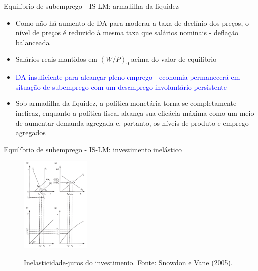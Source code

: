 \documentclass[10pt]{beamer}
\begin{document}
\begin{frame}{Equilíbrio de subemprego - IS-LM: armadilha da liquidez}
    \begin{itemize}
        \item Como não há aumento de DA para moderar a taxa de declínio dos preços, o nível de preços é reduzido à mesma taxa que salários nominais - deflação balanceada
        \bigskip
        \item Salários reais mantidos em $(W/P)_0$ acima do valor de equilíbrio
        \bigskip
        \item \textcolor{blue}{DA insuficiente para alcançar pleno emprego - economia permanecerá em situação de subemprego com um desemprego involuntário persistente}
        \bigskip
        \item Sob armadilha da liquidez, a política monetária torna-se completamente ineficaz, enquanto a política fiscal alcança sua eficácia máxima como um meio de aumentar demanda agregada e, portanto, os níveis de produto e emprego agregados
    \end{itemize}
\end{frame}

\begin{frame}{Equilíbrio de subemprego - IS-LM: investimento inelástico}
    \begin{figure}
        \centering
        \href{https://raw.githubusercontent.com/pvfonseca/pec/main/notas/figures/aula7_fig3.PNG}{\includegraphics[width=0.3\textwidth]{./figures/aula7_fig3.PNG}}
        \caption{Inelasticidade-juros do investimento. Fonte: Snowdon e Vane (2005).}
        \label{fig3}
    \end{figure}
\end{frame}
\end{document}
